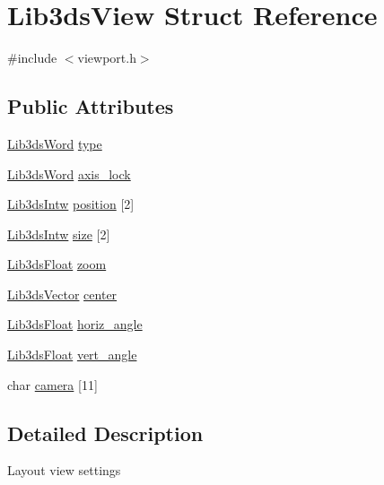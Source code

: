 \hypertarget{struct_lib3ds_view}{\section{Lib3ds\-View Struct Reference}
\label{struct_lib3ds_view}
}


{\ttfamily \#include $<$viewport.\-h$>$}

\subsection*{Public Attributes}
\begin{DoxyCompactItemize}
\item 
\hyperlink{types_8h_a439f68d12f4ad080599044949e41dba1}{Lib3ds\-Word} \hyperlink{struct_lib3ds_view_a107ef91905268d5ffeeb79f16312342d}{type}
\item 
\hyperlink{types_8h_a439f68d12f4ad080599044949e41dba1}{Lib3ds\-Word} \hyperlink{struct_lib3ds_view_ab112afa8d63e727a18c885c7c6e4d2b9}{axis\-\_\-lock}
\item 
\hyperlink{types_8h_ad6ca098afd6494c3cca6b63f136f59c8}{Lib3ds\-Intw} \hyperlink{struct_lib3ds_view_a1795efaf50246f332b85157e63a50484}{position} \mbox{[}2\mbox{]}
\item 
\hyperlink{types_8h_ad6ca098afd6494c3cca6b63f136f59c8}{Lib3ds\-Intw} \hyperlink{struct_lib3ds_view_a60f64c4ed0a32a00202b58d462a528ce}{size} \mbox{[}2\mbox{]}
\item 
\hyperlink{types_8h_ab18e70f51f9a53c9dee8d930c8e1a7bf}{Lib3ds\-Float} \hyperlink{struct_lib3ds_view_a2ad83f13008d25be3ab7b6dc36809d73}{zoom}
\item 
\hyperlink{group__vector_ga6ac1c3b3ef15381ebf6baf264d658dcf}{Lib3ds\-Vector} \hyperlink{struct_lib3ds_view_a7309cd9fb012c5547892590485484b3c}{center}
\item 
\hyperlink{types_8h_ab18e70f51f9a53c9dee8d930c8e1a7bf}{Lib3ds\-Float} \hyperlink{struct_lib3ds_view_a1161d557160ea7220b9557ce1eb61b3c}{horiz\-\_\-angle}
\item 
\hyperlink{types_8h_ab18e70f51f9a53c9dee8d930c8e1a7bf}{Lib3ds\-Float} \hyperlink{struct_lib3ds_view_adf23c4b2d4070ae1479ecf61031dfae3}{vert\-\_\-angle}
\item 
char \hyperlink{struct_lib3ds_view_a83cb527239c451b98783e712f39ce402}{camera} \mbox{[}11\mbox{]}
\end{DoxyCompactItemize}


\subsection{Detailed Description}
Layout view settings 

